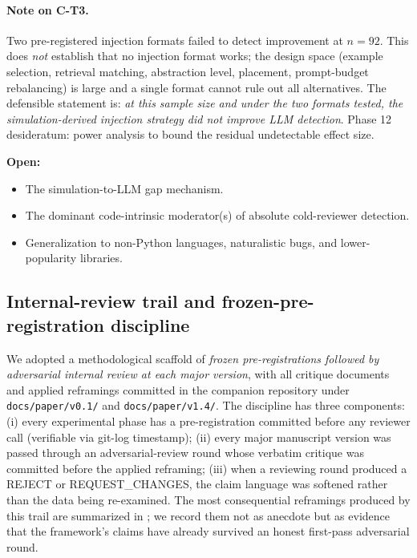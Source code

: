 \paragraph{Note on C-T3.} Two pre-registered injection formats failed to detect improvement at $n = 92$. This does \emph{not} establish that no injection format works; the design space (example selection, retrieval matching, abstraction level, placement, prompt-budget rebalancing) is large and a single format cannot rule out all alternatives. The defensible statement is: \emph{at this sample size and under the two formats tested, the simulation-derived injection strategy did not improve LLM detection}. Phase 12 desideratum: power analysis to bound the residual undetectable effect size.

\textbf{Open:}
\begin{itemize}[leftmargin=2em]
\item The simulation-to-LLM gap mechanism.
\item The dominant code-intrinsic moderator(s) of absolute cold-reviewer detection.
\item Generalization to non-Python languages, naturalistic bugs, and lower-popularity libraries.
\end{itemize}

\subsection{Internal-review trail and frozen-pre-registration discipline}
\label{sec:internal-review-trail}
\label{sec:peer-review-trail}

We adopted a methodological scaffold of \emph{frozen pre-registrations followed by adversarial internal review at each major version}, with all critique documents and applied reframings committed in the companion repository under \texttt{docs/paper/v0.1/} and \texttt{docs/paper/v1.4/}. The discipline has three components: (i) every experimental phase has a pre-registration committed before any reviewer call (verifiable via git-log timestamp); (ii) every major manuscript version was passed through an adversarial-review round whose verbatim critique was committed before the applied reframing; (iii) when a reviewing round produced a REJECT or REQUEST\_CHANGES, the claim language was softened rather than the data being re-examined. The most consequential reframings produced by this trail are summarized in ; we record them not as anecdote but as evidence that the framework's claims have already survived an honest first-pass adversarial round.

